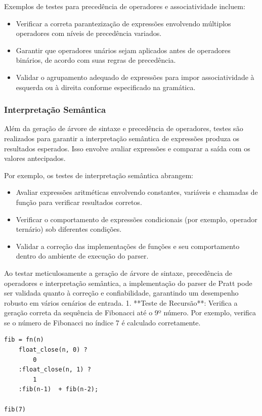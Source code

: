 \documentclass[english, 
               brazil, 
               bsc] %
               {dcomp-abntex2}
\begin{document}
Exemplos de testes para precedência de operadores e associatividade incluem:

\begin{itemize}
    \item Verificar a correta parantezização de expressões envolvendo múltiplos operadores com níveis de precedência variados.
    \item Garantir que operadores unários sejam aplicados antes de operadores binários, de acordo com suas regras de precedência.
    \item Validar o agrupamento adequado de expressões para impor associatividade à esquerda ou à direita conforme especificado na gramática.
\end{itemize}

\subsubsection{Interpretação Semântica}

Além da geração de árvore de sintaxe e precedência de operadores, testes são realizados para garantir a interpretação semântica de expressões produza os resultados esperados. Isso envolve avaliar expressões e comparar a saída com os valores antecipados.

Por exemplo, os testes de interpretação semântica abrangem:

\begin{itemize}
    \item Avaliar expressões aritméticas envolvendo constantes, variáveis e chamadas de função para verificar resultados corretos.
    \item Verificar o comportamento de expressões condicionais (por exemplo, operador ternário) sob diferentes condições.
    \item Validar a correção das implementações de funções e seu comportamento dentro do ambiente de execução do parser.
\end{itemize}

Ao testar meticulosamente a geração de árvore de sintaxe, precedência de operadores e interpretação semântica, a implementação do parser de Pratt pode ser validada quanto à correção e confiabilidade, garantindo um desempenho robusto em vários cenários de entrada.
1. **Teste de Recursão**: Verifica a geração correta da sequência de Fibonacci até o 9º número. Por exemplo, verifica se o número de Fibonacci no índice 7 é calculado corretamente.

\begin{verbatim}
fib = fn(n)  
    float_close(n, 0) ? 
        0
    :float_close(n, 1) ?
        1
    :fib(n-1)  + fib(n-2);

fib(7)
\end{verbatim}
\end{document}
